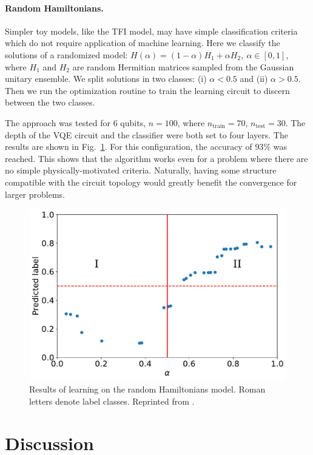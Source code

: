 \paragraph{Random Hamiltonians.} Simpler toy models, like the TFI model, may have simple classification criteria which do not require application of machine learning. Here we classify the solutions of a randomized model: $H(\alpha) = (1 - \alpha) H_1 + \alpha H_2, \ \alpha \in [0, 1]$, where $H_1$ and $H_2$ are random Hermitian matrices sampled from the Gaussian unitary ensemble. We split solutions in two classes: (i) $\alpha < 0.5$ and (ii) $\alpha > 0.5$. Then we run the optimization routine to train the learning circuit to discern between the two classes. 

The approach was tested for 6 qubits, $n=100$, where $n_\text{train} = 70$, $n_{\text{test}} = 30$. The depth of the VQE circuit and the classifier were both set to four layers. The results are shown in Fig.~\ref{fig:learning_random_hams}. For this configuration, the accuracy of $93 \%$ was reached. This shows that the algorithm works even for a problem where there are no simple physically-motivated criteria. Naturally, having some structure compatible with the circuit topology would greatly benefit the convergence for larger problems.


\begin{figure}
    \centering
    \includegraphics[width=0.7\linewidth]{figures/learning_random_hams}
    \caption{Results of learning on the random Hamiltonians model. Roman letters denote label classes. Reprinted from \cite{uvarov_machine_2020}.}
    \label{fig:learning_random_hams}
\end{figure}

\section{Discussion}

